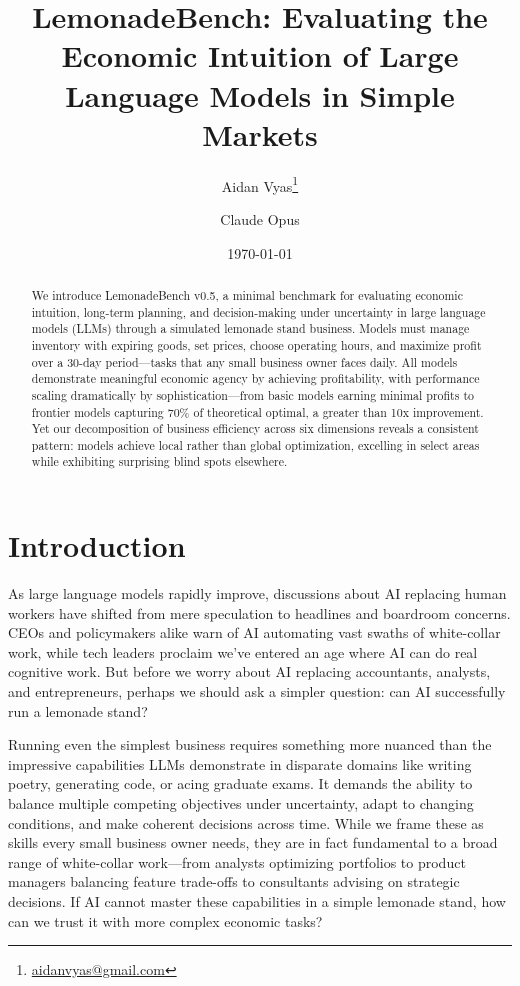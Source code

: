 \documentclass[11pt]{article}
\title{LemonadeBench: Evaluating the Economic Intuition of Large Language Models in Simple Markets}
\author{
    Aidan Vyas\footnote{\href{mailto:aidanvyas@gmail.com}{aidanvyas@gmail.com}}
    \and
    Claude Opus
}
\date{\today}
\begin{document}
\maketitle

\begin{abstract}

We introduce LemonadeBench v0.5, a minimal benchmark for evaluating economic intuition, long-term planning, and decision-making under uncertainty in large language models (LLMs) through a simulated lemonade stand business.
Models must manage inventory with expiring goods, set prices, choose operating hours, and maximize profit over a 30-day period—tasks that any small business owner faces daily.
All models demonstrate meaningful economic agency by achieving profitability, with performance scaling dramatically by sophistication—from basic models earning minimal profits to frontier models capturing 70\% of theoretical optimal, a greater than 10x improvement.
Yet our decomposition of business efficiency across six dimensions reveals a consistent pattern: models achieve local rather than global optimization, excelling in select areas while exhibiting surprising blind spots elsewhere.

\end{abstract}

\section{Introduction}

As large language models rapidly improve, discussions about AI replacing human workers have shifted from mere speculation to headlines and boardroom concerns.
CEOs and policymakers alike warn of AI automating vast swaths of white-collar work, while tech leaders proclaim we've entered an age where AI can do real cognitive work.
But before we worry about AI replacing accountants, analysts, and entrepreneurs, perhaps we should ask a simpler question: can AI successfully run a lemonade stand?

Running even the simplest business requires something more nuanced than the impressive capabilities LLMs demonstrate in disparate domains like writing poetry, generating code, or acing graduate exams.
It demands the ability to balance multiple competing objectives under uncertainty, adapt to changing conditions, and make coherent decisions across time.
While we frame these as skills every small business owner needs, they are in fact fundamental to a broad range of white-collar work—from analysts optimizing portfolios to product managers balancing feature trade-offs to consultants advising on strategic decisions.
If AI cannot master these capabilities in a simple lemonade stand, how can we trust it with more complex economic tasks?
\end{document}
